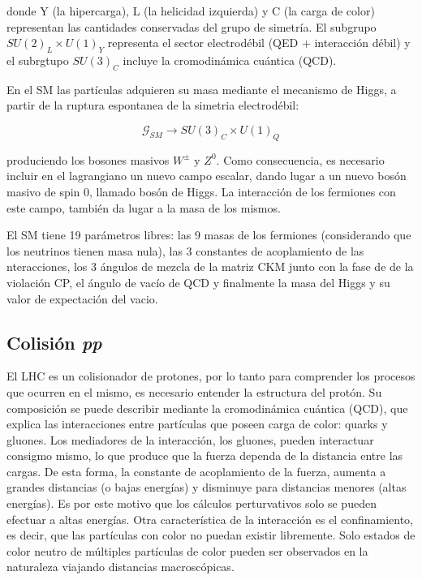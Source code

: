 donde Y (la hipercarga), L (la helicidad izquierda) y C (la carga de color) representan las cantidades conservadas del grupo de simetría. El subgrupo $SU(2)_{L}\times U(1)_{Y}$ representa el sector electrodébil (QED + interacción débil) y el subrgtupo $SU(3)_{C}$ incluye la cromodinámica cuántica (QCD).


En el SM las partículas adquieren su masa mediante el mecanismo de Higgs, a partir de la ruptura espontanea de la simetria electrodébil:

\begin{equation}
\mathcal{G}_{SM}\rightarrow SU(3)_{C}\times U(1)_{Q}
\end{equation}

produciendo los bosones masivos $W^{\pm}$ y $Z^{0}$. Como consecuencia, es necesario incluir en el lagrangiano un nuevo campo escalar, dando lugar a un nuevo bosón masivo de spin 0, llamado bosón de Higgs. La interacción de los fermiones con este campo, también da lugar a la masa de los mismos.

El SM tiene 19 parámetros libres: las 9 masas de los fermiones (considerando que los neutrinos tienen masa nula), las 3 constantes de acoplamiento de las nteracciones, los 3 ángulos de mezcla de la matriz CKM junto con la fase de de la violación CP, el ángulo de vacío de QCD y finalmente la masa del Higgs y su valor de expectación del vacio.


\subsection{Colisión \textit{pp}}

El LHC es un colisionador de protones, por lo tanto para comprender los procesos que ocurren en el mismo, es necesario entender la estructura del protón. Su composición se puede describir mediante la cromodinámica cuántica (QCD), que explica las interacciones entre partículas que poseen carga de color: quarks y gluones. Los mediadores de la interacción, los gluones, pueden interactuar consigmo mismo, lo que produce que la fuerza dependa de la distancia entre las cargas. De esta forma, la constante de acoplamiento de la fuerza, aumenta a grandes distancias (o bajas energías) y disminuye para distancias menores (altas energías). Es por este motivo que los cálculos perturvativos solo se pueden efectuar a altas energías. Otra característica de la interacción es el confinamiento, es decir, que las partículas con color no puedan existir libremente. Solo estados de color neutro de múltiples partículas de color pueden ser observados en la naturaleza viajando distancias macroscópicas.

